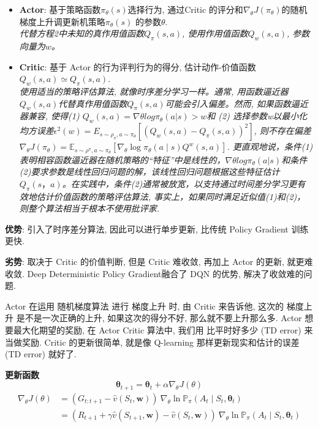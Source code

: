 \documentclass{article}
\newcommand{\env}[2]{\begin{#1}#2\end{#1}}
\begin{document}
        \env{itemize}{
            \item \textbf{Actor}: 基于策略函数$\pi_\theta(s)$选择行为, 通过Critic 的评分和$\nabla_{\theta} J\left(\pi_{\theta}\right)$的随机梯度上升调更新机策略$\pi_\theta(s)$ 的参数$\theta$. \\ \textit{代替方程2中未知的真作用值函数$Q_\pi (s, a)$, 使用作用值函数$Q_w (s, a)$, 参数向量为$w$。}
            
            \item \textbf{Critic}: 基于 Actor 的行为评判行为的得分, 估计动作-价值函数$Q_w (s, a) \simeq  Q_\pi (s, a)$. \\ \textit{使用适当的策略评估算法, 就像时序差分学习一样。通常, 用函数逼近器$Q_w (s, a)$代替真作用值函数$Q_\pi (s, a)$可能会引入偏差。然而, 如果函数逼近器兼容, 使得(1) $Q_w (s, a) = \nabla \theta log \pi_\theta (a | s)>w$和 (2) 选择参数w以最小化均方误差$\epsilon^2 (w)=E_{s \sim \rho_\pi, a \sim \pi_\theta} [ (Q_w (s, a)− Q_\pi (s, a))^2]$, 则不存在偏差$\nabla_{\theta} J\left(\pi_{\theta}\right)=\mathbb{E}_{s \sim \rho^{\pi}, a \sim \pi_{\theta}}\left[\nabla_{\theta} \log \pi_{\theta}(a \mid s) Q^{w}(s, a)\right]$. 更直观地说，条件(1)表明相容函数逼近器在随机策略的“特征”中是线性的，$\nabla \theta log \pi_\theta (a | s)$和条件(2)要求参数是线性回归问题的解，该线性回归问题根据这些特征估计$Q_\pi(s，a)$。在实践中，条件(2)通常被放宽，以支持通过时间差分学习更有效地估计价值函数的策略评估算法, 事实上，如果同时满足近似值(1)和(2)，则整个算法相当于根本不使用批评家. }
        }

        \textbf{优势}: 引入了时序差分算法, 因此可以进行单步更新, 比传统 Policy Gradient 训练更快.
        
        \textbf{劣势}: 取决于 Critic 的价值判断, 但是 Critic 难收敛, 再加上 Actor 的更新, 就更难收敛. Deep Deterministic Policy Gradient融合了 DQN 的优势, 解决了收敛难的问题.  
        
        Actor 在运用 随机梯度算法 进行 梯度上升 时, 由 Critic 来告诉他, 这次的 梯度上升 是不是一次正确的上升, 如果这次的得分不好, 那么就不要上升那么多. Actor 想要最大化期望的奖励, 在 Actor Critic 算法中, 我们用 比平时好多少 (TD error) 来当做奖励. Critic 的更新很简单, 就是像 Q-learning 那样更新现实和估计的误差 (TD error) 就好了.
    
        \textbf{更新函数}
        $$\boldsymbol{\theta}_{t+1} = \boldsymbol{\theta}_{t}+\alpha \nabla_\theta J(\theta)$$
        \env{align*}{
            \nabla_\theta J(\theta)
            &= \left(G_{t: t+1}-\hat{v}\left(S_{t}, \mathbf{w}\right)\right)\  \nabla_\theta \ln \mathbb P_\pi\left(A_{t} \mid S_{t}, \boldsymbol{\theta}_{t}\right) \\
            &= \left(R_{t+1}+\gamma \hat{v}\left(S_{t+1}, \mathbf{w}\right)-\hat{v}\left(S_{t}, \mathbf{w}\right)\right)\ \nabla_\theta \ln \mathbb P_\pi\left(A_{t} \mid S_{t}, \boldsymbol{\theta}_{t}\right) 
        }
        
\end{document}
